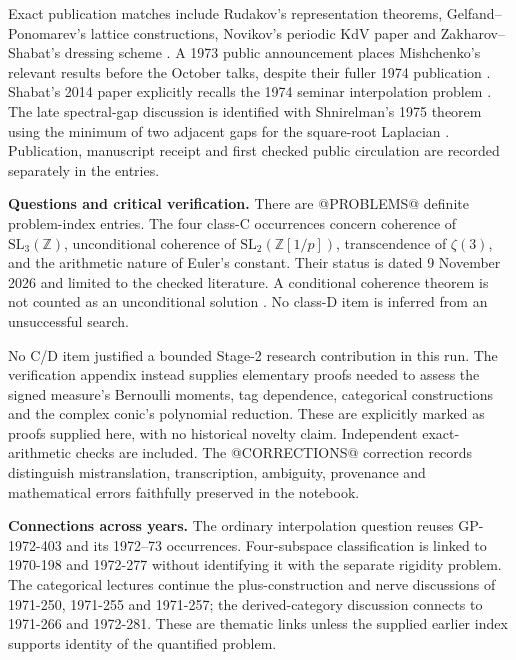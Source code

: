 Exact publication matches include Rudakov's representation theorems,
Gelfand--Ponomarev's lattice constructions, Novikov's periodic KdV paper and
Zakharov--Shabat's dressing scheme
\citep{rudakov1974irreducible,gelfandponomarev1974modular,novikov1974periodic,zakharovshabat1974scheme}.
A 1973 public announcement places
Mishchenko's relevant results before the October talks, despite their fuller
1974 publication \citep{mishchenko1973infinite}. Shabat's 2014 paper explicitly recalls the 1974 seminar
interpolation problem \citep{shabat2014interpolation}. The late spectral-gap discussion is identified with
Shnirelman's 1975 theorem using the minimum of two adjacent gaps for the
square-root Laplacian \citep{shnirelman1975multiplicity}. Publication, manuscript receipt and first checked
public circulation are recorded separately in the entries.

\medskip\noindent\textbf{Questions and critical verification.}
There are @PROBLEMS@ definite problem-index entries. The four class-C
occurrences concern coherence of \(\mathrm{SL}_3(\mathbb Z)\), unconditional
coherence of \(\mathrm{SL}_2(\mathbb Z[1/p])\), transcendence of \(\zeta(3)\),
and the arithmetic nature of Euler's constant. Their status is dated
9 November 2026 and limited to the checked literature. A conditional
coherence theorem is not counted as an unconditional solution
\citep[Theorem~4.2, version~3]{brody2025commensurator}. No class-D
item is inferred from an unsuccessful search.

No C/D item justified a bounded Stage-2 research contribution in this run.
The verification appendix instead supplies elementary proofs needed to
assess the signed measure's Bernoulli moments, tag dependence, categorical
constructions and the complex conic's polynomial reduction. These are explicitly marked as proofs
supplied here, with no historical novelty claim. Independent exact-arithmetic
checks are included. The @CORRECTIONS@ correction records distinguish mistranslation,
transcription, ambiguity, provenance and mathematical errors faithfully
preserved in the notebook.

\medskip\noindent\textbf{Connections across years.}
The ordinary interpolation question reuses GP-1972-403 and its 1972--73
occurrences. Four-subspace classification is linked to 1970-198 and
1972-277 without identifying it with the separate rigidity problem.
The categorical lectures continue the plus-construction and nerve discussions
of 1971-250, 1971-255 and 1971-257; the derived-category discussion connects to
1971-266 and 1972-281. These are thematic links unless the supplied earlier
index supports identity of the quantified problem.
